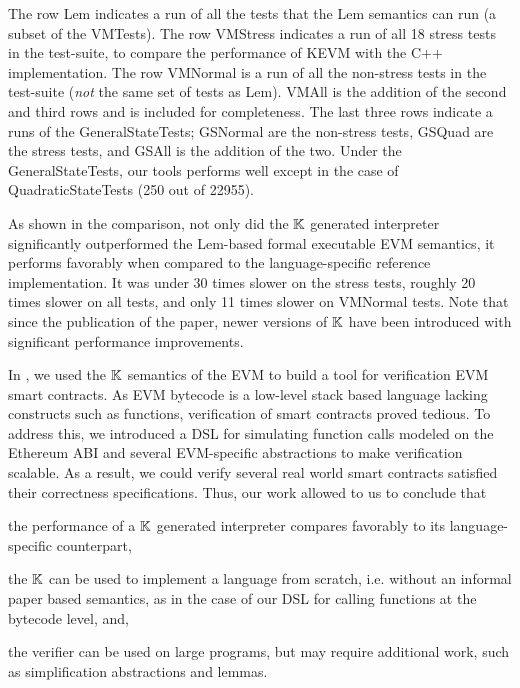 The row Lem indicates a run of all the tests that the Lem semantics can run (a subset of the VMTests).
The row VMStress indicates a run of all 18 stress tests in the test-suite, to compare the performance of KEVM with the C++ implementation.
The row VMNormal is a run of all the non-stress tests in the test-suite (\textit{not} the same set of tests as Lem).
VMAll is the addition of the second and third rows and is included for completeness.
The last three rows indicate a runs of the GeneralStateTests; GSNormal are the non-stress tests, GSQuad are the stress tests, and GSAll is the addition of the two.
Under the GeneralStateTests, our tools performs well except in the case of QuadraticStateTests (250 out of 22955).

As shown in the comparison, not only did the $\mathbb{K}$ generated interpreter significantly
outperformed the Lem-based formal executable EVM semantics, it performs
favorably when compared to the language-specific reference implementation.
It was under 30 times slower on the stress tests, roughly 20 times
slower on all tests, and only 11 times slower on VMNormal tests.
Note that since the publication of the paper, newer versions
of $\mathbb{K}$ have been introduced with significant performance improvements.

In \cite{HildenbrandtCSF18,ParkFSE18}, we used the $\mathbb{K}$ semantics of the EVM to
build a tool for verification EVM smart contracts. As EVM bytecode is a
low-level stack based language lacking constructs such as functions,
verification of smart contracts proved tedious. To address this, we
introduced a DSL for simulating function calls modeled on the Ethereum ABI
\cite{ethereumAbiUrl} and several EVM-specific abstractions to make verification
scalable. As a result, we could verify several real world smart contracts
satisfied their correctness specifications. Thus, our work allowed to us
to conclude that
\begin{enumerate*}[label=(\roman*)]
  \item the performance of a $\mathbb{K}$ generated interpreter compares favorably to its
  language-specific counterpart,
  \item the $\mathbb{K}$ can be used to implement a language from scratch, i.e. without
  an informal paper based semantics, as in the case of our DSL for calling
  functions at the bytecode level, and,
  \item the verifier can be used on large programs, but may require additional
  work, such as simplification abstractions and lemmas.
\end{enumerate*}


